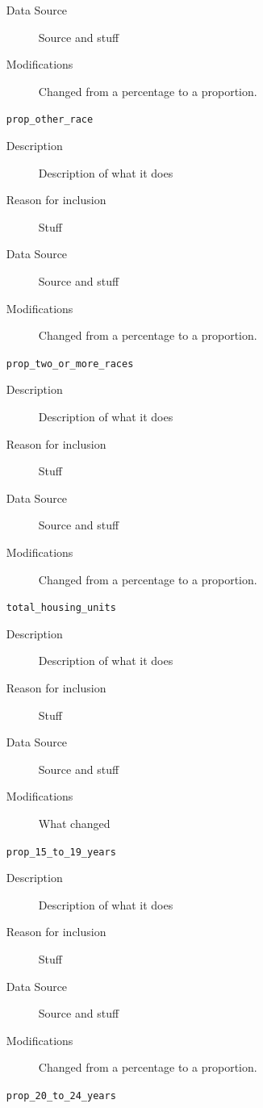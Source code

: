 \documentclass{article}
\begin{document}
\begin{itemize}[label={}, align=left]
\begin{description}
		      \item[Data Source] Source and stuff
		      \item[Modifications] Changed from a percentage to a proportion.
	      \end{description}
	\item[\texttt{prop\_other\_race}] \
	      \begin{description}
		      \item[Description] Description of what it does
		      \item[Reason for inclusion] Stuff
		      \item[Data Source] Source and stuff
		      \item[Modifications] Changed from a percentage to a proportion.
	      \end{description}
	\item[\texttt{prop\_two\_or\_more\_races}] \
	      \begin{description}
		      \item[Description] Description of what it does
		      \item[Reason for inclusion] Stuff
		      \item[Data Source] Source and stuff
		      \item[Modifications] Changed from a percentage to a proportion.
	      \end{description}
	\item[\texttt{total\_housing\_units}] \
	      \begin{description}
		      \item[Description] Description of what it does
		      \item[Reason for inclusion] Stuff
		      \item[Data Source] Source and stuff
		      \item[Modifications] What changed
	      \end{description}
	\item[\texttt{prop\_15\_to\_19\_years}] \
	      \begin{description}
		      \item[Description] Description of what it does
		      \item[Reason for inclusion] Stuff
		      \item[Data Source] Source and stuff
		      \item[Modifications] Changed from a percentage to a proportion.
	      \end{description}
	\item[\texttt{prop\_20\_to\_24\_years}] \

\end{itemize}
\end{document}
